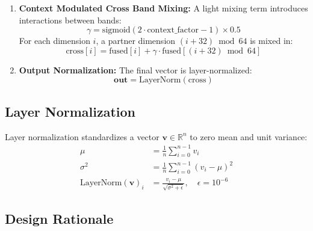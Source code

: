 \documentclass[12pt]{article}
\begin{document}
\begin{enumerate}
    \item \textbf{Context Modulated Cross Band Mixing:}
    A light mixing term introduces interactions between bands:
    \begin{equation}
        \gamma = \text{sigmoid}(2 \cdot \text{context\_factor} - 1)
        \times 0.5
    \end{equation}
    For each dimension $i$, a partner dimension
    $(i + 32) \bmod 64$ is mixed in:
    \begin{equation}
        \text{cross}[i] = \text{fused}[i] + \gamma \cdot
        \text{fused}[(i + 32) \bmod 64]
    \end{equation}

    \item \textbf{Output Normalization:}
    The final vector is layer-normalized:
    \begin{equation}
        \mathbf{out} = \text{LayerNorm}(\text{cross})
    \end{equation}
\end{enumerate}

\subsection{Layer Normalization}
\label{subsec:layernorm}
Layer normalization standardizes a vector
$\mathbf{v} \in \mathbb{R}^n$ to zero mean and unit variance:
\begin{align}
    \mu &= \frac{1}{n} \sum_{i=0}^{n-1} v_i \\
    \sigma^2 &= \frac{1}{n} \sum_{i=0}^{n-1} (v_i - \mu)^2 \\
    \text{LayerNorm}(\mathbf{v})_i &= \frac{v_i - \mu}
    {\sqrt{\sigma^2 + \epsilon}}, \quad \epsilon = 10^{-6}
\end{align}

\subsection{Design Rationale}
\label{subsec:rationale}
\end{document}
